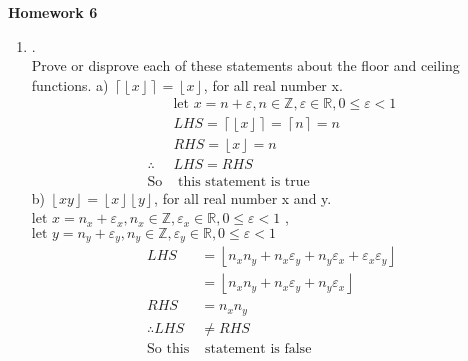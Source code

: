 \documentclass{article}
\theoremstyle{definition}
\theoremstyle{plain}
\providecommand{\ceil}[1]{\left \lceil #1 \right \rceil }
\providecommand{\floor}[1]{\left \lfloor #1 \right \rfloor }
\begin{document}
\begin{center} \bf \LARGE Homework 6\\
\end{center}


\begin {enumerate}[itemindent=30pt,label=\bf Exercise {\arabic*}:]
\item .\\Prove or disprove each of these statements about the floor and ceiling functions.
\subitem a) $\ceil{\floor{x}} = \floor{x}$, for all real number x.
\begin{align*}
	&\text{let } x = n + \varepsilon, n \in \mathbb{Z}, \varepsilon \in \mathbb{R},  0 \leq \varepsilon < 1\\
	&LHS = \ceil{\floor{x}} = \ceil{n} = n\\
	&RHS = \floor{x} = n\\
	\therefore &LHS = RHS\\
	\text{So}&\text{ this statement is true}
\end{align*}
\subitem b) $\floor{xy} = \floor{x} \floor{y}$, for all real number x and y.
\subitem $\text{let } x = n_{x} + \varepsilon_{x}, n_{x} \in \mathbb{Z}, \varepsilon_{x} \in \mathbb{R},  0 \leq \varepsilon < 1$ , $\text{let } y = n_{y} + \varepsilon_{y}, n_{y} \in \mathbb{Z}, \varepsilon_{y} \in \mathbb{R},  0 \leq \varepsilon < 1$
\begin{align*}
	LHS &= \floor{n_{x}n_{y} + n_{x}\varepsilon_{y} + n_{y}\varepsilon_{x} + \varepsilon_{x} \varepsilon_{y}}  \\
	&= \floor{n_{x}n_{y} + n_{x}\varepsilon_{y} + n_{y}\varepsilon_{x}}\\
	RHS &= n_{x}n_{y}\\
	 \therefore LHS &\neq RHS\\
	 \text{So this}&\text{ statement is false}
\end{align*}


\end{enumerate}
\end{document}
